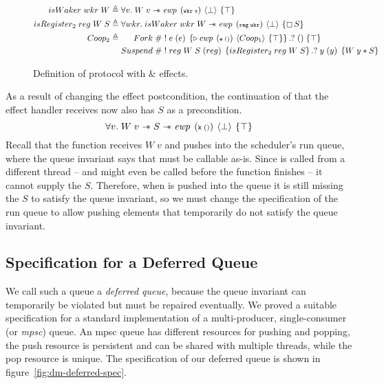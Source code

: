 \begin{figure}[ht]
  \begin{align*}
    \gsIsWaker{}\; wkr\; W    & \triangleq \forall v.   \;  W\; v \wand{} \ewp{wkr\; v}{\bot}{\top}\label{spec:is_waker-2}                                                              \\
    \gsIsReg{2}\; reg\; W\; S & \triangleq \forall wkr. \; \gsIsWaker{}\; wkr\; W \wand{} \ewp{reg\; wkr}{\bot}{\always S}                                                              \\
    \proto{2}                 & \triangleq \begin{aligned}[t]
                                             Fork\;    & \# \; !\; e\; (e)\; \left\{\later \ewp{e\;()}{\proto{1}}{\top}\right\}. ?\; ()\; \{ \top \}                          \\
                                             Suspend\; & \# \; !\; reg\; W\; S\; (reg)\; \left\{\gsIsReg{2}\; reg\; W\; S\right\}.?\; y\; (y)\; \left\{ W\; y \ast S \right\}
                                           \end{aligned}
  \end{align*}
  \caption{Definition of  protocol with \efork{} \& \esuspend{} effects.}
  \label{fig:coop-protocol-2}\label{spec:suspend-2}
\end{figure}
%
As a result of changing the effect postcondition, the continuation  of \esuspend{} that the effect handler receives now also has \(S\) as a precondition.
\[
  \forall v.\; W\; v \wand{} S \wand \ewp{k\; ()}{\bot}{\top}
\]
Recall that the  function receives \(W\; v\) and pushes  into the scheduler's run queue, where the queue invariant says that  must be callable as-is.
Since  is called from a different thread -- and might even be called before the  function finishes -- it cannot supply the \(S\).
Therefore, when  is pushed into the queue it is still missing the \(S\) to satisfy the queue invariant, so we must change the specification of the run queue to allow pushing elements that temporarily do not satisfy the queue invariant.

\subsection{Specification for a Deferred Queue}
We call such a queue a \emph{deferred queue}, because the queue invariant can temporarily be violated but must be repaired eventually.
We proved a suitable specification for a standard implementation of a multi-producer, single-consumer (or \emph{mpsc}) queue.
An mpsc queue has different resources for pushing and popping, the push resource is persistent and can be shared with multiple threads, while the pop resource is unique.
The specification of our deferred queue is shown in figure~\ref{fig:dm-deferred-spec}.

